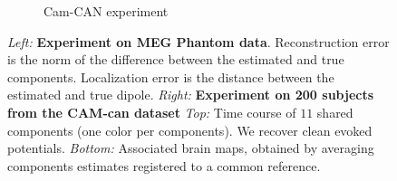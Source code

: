 \documentclass{report}
\begin{document}
\begin{figure}
\begin{minipage}{\linewidth}
\begin{minipage}{0.45\linewidth}
\begin{subfigure}[t]{\textwidth}
            \caption{Cam-CAN experiment}
        \end{subfigure}
      \end{minipage}
    \end{minipage}
    \setlength{\belowcaptionskip}{-10pt}
    \caption{\emph{Left:} \textbf{Experiment on MEG Phantom data}. Reconstruction error is the norm of the difference between the estimated and true components. Localization error is the distance between the estimated and true dipole. \emph{Right:} \textbf{Experiment on 200 subjects from the CAM-can dataset} \emph{Top:} Time course of $11$ shared components (one color per components). We recover clean evoked potentials. \emph{Bottom:} Associated brain maps, obtained by averaging components estimates registered to a common reference.}
    \label{fig:meg}
\end{figure}

\vspace{-11pt}
%
%
\end{document}
